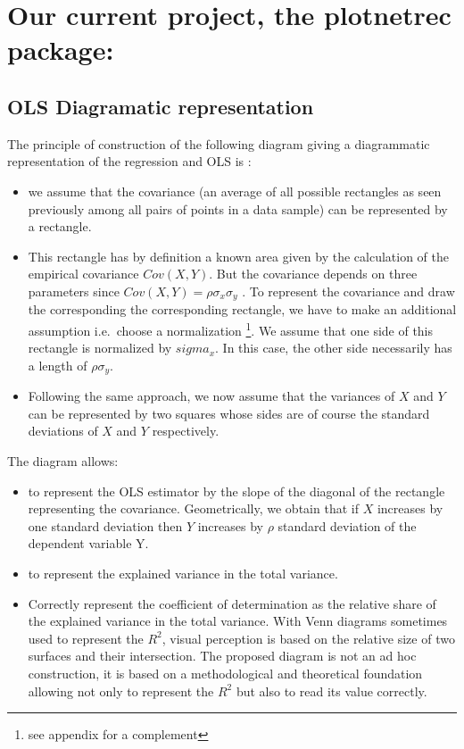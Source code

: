 \documentclass[
]{report}
\providecommand{\tightlist}{%
  \setlength{\itemsep}{0pt}\setlength{\parskip}{0pt}}
\begin{document}
\hypertarget{our-current-project-the-plotnetrec-package}{%
\section{Our current project, the plotnetrec package:}\label{our-current-project-the-plotnetrec-package}}

\hypertarget{ols-diagramatic-representation}{%
\subsection{OLS Diagramatic representation}\label{ols-diagramatic-representation}}

The principle of construction of the following diagram giving a diagrammatic representation of the regression and OLS is :

\begin{itemize}
\tightlist
\item
  we assume that the covariance (an average of all possible rectangles as seen previously among all pairs of points in a data sample) can be represented by a rectangle.
\item
  This rectangle has by definition a known area given by the calculation of the empirical covariance \(Cov(X,Y)\). But the covariance depends on three parameters since \(Cov(X,Y) =\rho \sigma_x \sigma_y\) . To represent the covariance and draw the corresponding
  the corresponding rectangle, we have to make an additional assumption i.e.~choose a normalization \footnote{see appendix for a complement}.
  We assume that one side of this rectangle is normalized by \(sigma_x\). In this case, the other side necessarily has a length of \(\rho \sigma_y\).
\item
  Following the same approach, we now assume that the variances of \(X\) and \(Y\) can be represented by two squares whose sides are of course the standard deviations of \(X\) and \(Y\) respectively.
\end{itemize}

The diagram allows:

\begin{itemize}
\tightlist
\item
  to represent the OLS estimator by the slope of the diagonal of the rectangle representing the covariance. Geometrically, we obtain that if \(X\) increases by one standard deviation then \(Y\) increases by \(\rho\) standard deviation of the dependent variable Y.
\item
  to represent the explained variance in the total variance.
\item
  Correctly represent the coefficient of determination as the relative share of the explained variance in the total variance. With Venn diagrams sometimes used to represent the \(R^2\), visual perception is based on the relative size of two surfaces and their intersection. The proposed diagram is not an ad hoc construction, it is based on a methodological and theoretical foundation allowing not only to represent the \(R^2\) but also to read its value correctly.
\end{itemize}
\end{document}

